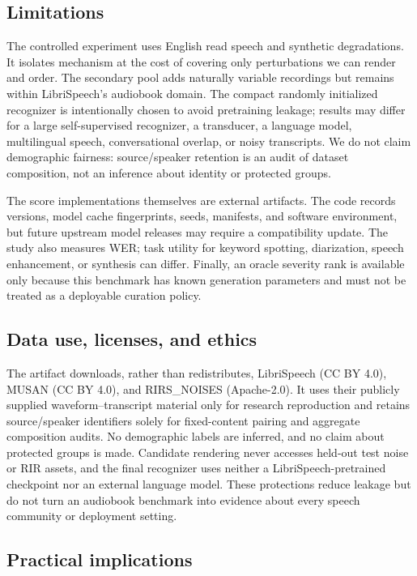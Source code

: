 \documentclass[10pt,twocolumn]{article}
\newcommand{\wer}{\textsc{WER}}
\begin{document}
\subsection{Limitations}

The controlled experiment uses English read speech and synthetic degradations. It isolates mechanism at the cost of covering only perturbations we can render and order. The secondary pool adds naturally variable recordings but remains within LibriSpeech's audiobook domain. The compact randomly initialized recognizer is intentionally chosen to avoid pretraining leakage; results may differ for a large self-supervised recognizer, a transducer, a language model, multilingual speech, conversational overlap, or noisy transcripts. We do not claim demographic fairness: source/speaker retention is an audit of dataset composition, not an inference about identity or protected groups.

The score implementations themselves are external artifacts. The code records versions, model cache fingerprints, seeds, manifests, and software environment, but future upstream model releases may require a compatibility update. The study also measures \wer{}; task utility for keyword spotting, diarization, speech enhancement, or synthesis can differ. Finally, an oracle severity rank is available only because this benchmark has known generation parameters and must not be treated as a deployable curation policy.

\subsection{Data use, licenses, and ethics}

The artifact downloads, rather than redistributes, LibriSpeech (CC BY 4.0), MUSAN (CC BY 4.0), and RIRS\_NOISES (Apache-2.0). It uses their publicly supplied waveform--transcript material only for research reproduction and retains source/speaker identifiers solely for fixed-content pairing and aggregate composition audits. No demographic labels are inferred, and no claim about protected groups is made. Candidate rendering never accesses held-out test noise or RIR assets, and the final recognizer uses neither a LibriSpeech-pretrained checkpoint nor an external language model. These protections reduce leakage but do not turn an audiobook benchmark into evidence about every speech community or deployment setting.

\subsection{Practical implications}
\end{document}
